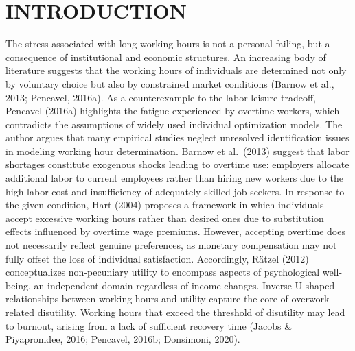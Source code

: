 \documentclass[
  12pt,
]{article}
\begin{document}
\tableofcontents

\newpage

\listoftables

\newpage

\listoffigures

\newpage
\cleardoublepage
{}
\setcounter{page}{1}
\raggedright
\setlength{\parindent}{2em}
\setlength{\parskip}{0pt}
\pagestyle{fancy}

\section{INTRODUCTION}\label{introduction}

The stress associated with long working hours is not a personal failing,
but a consequence of institutional and economic structures. An
increasing body of literature suggests that the working hours of
individuals are determined not only by voluntary choice but also by
constrained market conditions (Barnow et al., 2013; Pencavel, 2016a). As
a counterexample to the labor-leisure tradeoff, Pencavel (2016a)
highlights the fatigue experienced by overtime workers, which
contradicts the assumptions of widely used individual optimization
models. The author argues that many empirical studies neglect unresolved
identification issues in modeling working hour determination. Barnow et
al.~(2013) suggest that labor shortages constitute exogenous shocks
leading to overtime use: employers allocate additional labor to current
employees rather than hiring new workers due to the high labor cost and
insufficiency of adequately skilled job seekers. In response to the
given condition, Hart (2004) proposes a framework in which individuals
accept excessive working hours rather than desired ones due to
substitution effects influenced by overtime wage premiums. However,
accepting overtime does not necessarily reflect genuine preferences, as
monetary compensation may not fully offset the loss of individual
satisfaction. Accordingly, Rätzel (2012) conceptualizes non-pecuniary
utility to encompass aspects of psychological well-being, an independent
domain regardless of income changes. Inverse U-shaped relationships
between working hours and utility capture the core of overwork-related
disutility. Working hours that exceed the threshold of disutility may
lead to burnout, arising from a lack of sufficient recovery time (Jacobs
\& Piyapromdee, 2016; Pencavel, 2016b; Donsimoni, 2020).
\end{document}
